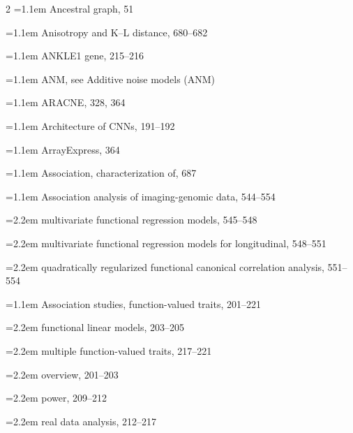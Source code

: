 \begin{multicols}{2}
\noindent\hangindent=1.1em Ancestral graph, 51\par
\noindent\hangindent=1.1em Anisotropy and K--L distance, 680--682\par
\noindent\hangindent=1.1em ANKLE1 gene, 215--216\par
\noindent\hangindent=1.1em ANM, see Additive noise models (ANM)\par
\noindent\hangindent=1.1em ARACNE, 328, 364\par
\noindent\hangindent=1.1em Architecture of CNNs, 191--192\par
\noindent\hangindent=1.1em ArrayExpress, 364\par
\noindent\hangindent=1.1em Association, characterization of, 687\par
\noindent\hangindent=1.1em Association analysis of imaging-genomic data, 544--554\par
\noindent\hangindent=2.2em \hspace*{1.1em}multivariate functional regression models, 545--548\par
\noindent\hangindent=2.2em \hspace*{1.1em}multivariate functional regression models for longitudinal, 548--551\par
\noindent\hangindent=2.2em \hspace*{1.1em}quadratically regularized functional canonical correlation analysis, 551--554\par
\noindent\hangindent=1.1em Association studies, function-valued traits, 201--221\par
\noindent\hangindent=2.2em \hspace*{1.1em}functional linear models, 203--205\par
\noindent\hangindent=2.2em \hspace*{1.1em}multiple function-valued traits, 217--221\par
\noindent\hangindent=2.2em \hspace*{1.1em}overview, 201--203\par
\noindent\hangindent=2.2em \hspace*{1.1em}power, 209--212\par
\noindent\hangindent=2.2em \hspace*{1.1em}real data analysis, 212--217\par

\end{multicols}
